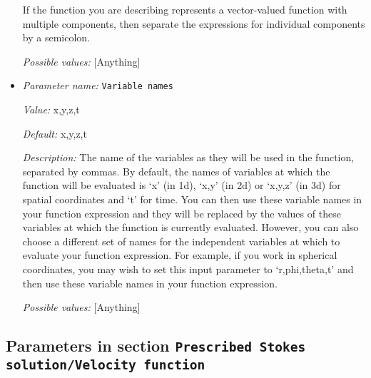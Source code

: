 \begin{itemize}
If the function you are describing represents a vector-valued function with multiple components, then separate the expressions for individual components by a semicolon.


{\it Possible values:} [Anything]
\item {\it Parameter name:} {\tt Variable names}
\label{parameters:Prescribed Stokes solution/Pressure function/Variable names}


{\it Value:} x,y,z,t


{\it Default:} x,y,z,t


{\it Description:} The name of the variables as they will be used in the function, separated by commas. By default, the names of variables at which the function will be evaluated is `x' (in 1d), `x,y' (in 2d) or `x,y,z' (in 3d) for spatial coordinates and `t' for time. You can then use these variable names in your function expression and they will be replaced by the values of these variables at which the function is currently evaluated. However, you can also choose a different set of names for the independent variables at which to evaluate your function expression. For example, if you work in spherical coordinates, you may wish to set this input parameter to `r,phi,theta,t' and then use these variable names in your function expression.


{\it Possible values:} [Anything]
\end{itemize}

\subsection{Parameters in section \tt Prescribed Stokes solution/Velocity function}
\label{parameters:Prescribed_20Stokes_20solution/Velocity_20function}

